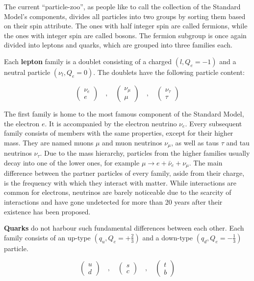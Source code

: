 \noindent The current ``particle-zoo'', as people like to call the collection of the Standard Model's components, divides all particles into two groups by sorting them based on their spin attribute. The ones with half integer spin are called fermions, while the ones with integer spin are called bosons. The fermion subgroup is once again divided into leptons and quarks, which are grouped into three families each.

Each \textbf{lepton} family is a doublet consisting of a charged $( l, Q_e = -1 )$ and a neutral particle $( \nu_l, Q_e = 0 )$. The doublets have the following particle content:

\begin{equation*}
  \begin{pmatrix}
    \nu_e \\
    e
  \end{pmatrix}
  \quad , \quad
  \begin{pmatrix}
    \nu_\mu \\
    \mu
  \end{pmatrix}
  \quad , \quad
  \begin{pmatrix}
    \nu_\tau \\
    \tau
  \end{pmatrix}
\end{equation*}

The first family is home to the most famous component of the Standard Model, the electron $e$. It is accompanied by the electron neutrino $\nu_e$. Every subsequent family consists of members with the same properties, except for their higher mass. They are named muons $\mu$ and muon neutrinos $\nu_\mu$, as well as taus $\tau$ and tau neutrinos $\nu_\tau$. Due to the mass hierarchy, particles from the higher families usually decay into one of the lower ones, for example $\mu \rightarrow e + \bar{\nu}_e + \nu_\mu$. The main difference between the partner particles of every family, aside from their charge, is the frequency with which they interact with matter. While interactions are common for electrons, neutrinos are barely noticeable due to the scarcity of interactions and have gone undetected for more than 20 years after their existence has been proposed.

\textbf{Quarks} do not harbour such fundamental differences between each other. Each family consists of an up-type $( q_u, Q_e = +\frac{2}{3} )$ and a down-type $( q_d, Q_e = -\frac{1}{3} )$ particle. 

\begin{equation*}
  \begin{pmatrix}
    u \\
    d
  \end{pmatrix}
  \quad , \quad
  \begin{pmatrix}
    s \\
    c
  \end{pmatrix}
  \quad , \quad
  \begin{pmatrix}
    t \\
    b
  \end{pmatrix}
\end{equation*}

